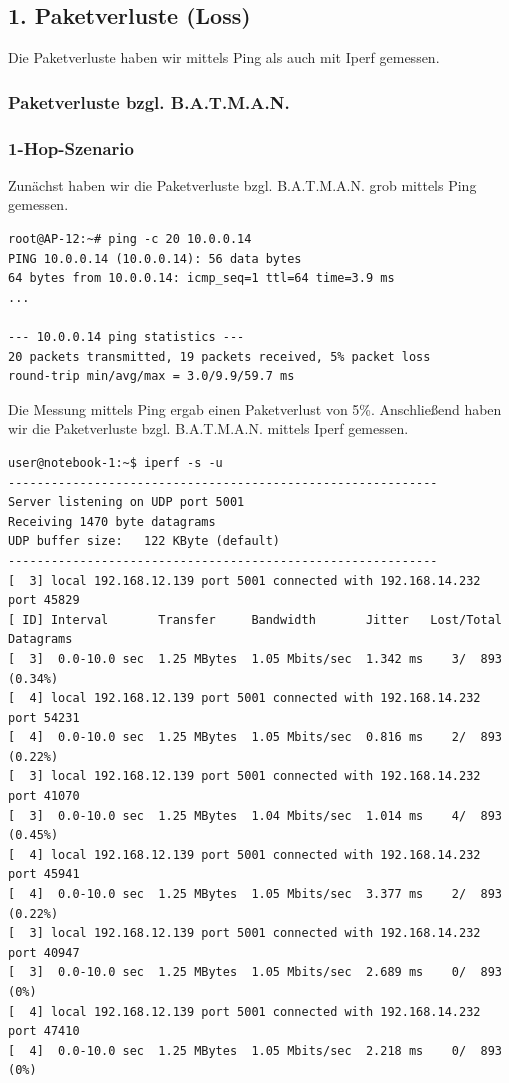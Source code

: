 \documentclass[a4paper,10pt]{article}
\begin{document}
\subsection{1. Paketverluste (Loss)}

Die Paketverluste haben wir mittels Ping als auch mit Iperf gemessen.

\subsubsection{Paketverluste bzgl. B.A.T.M.A.N.}

\subsubsection*{1-Hop-Szenario}

Zunächst haben wir die Paketverluste bzgl. B.A.T.M.A.N. grob mittels Ping gemessen.

\begin{lstlisting}
root@AP-12:~# ping -c 20 10.0.0.14
PING 10.0.0.14 (10.0.0.14): 56 data bytes
64 bytes from 10.0.0.14: icmp_seq=1 ttl=64 time=3.9 ms
...

--- 10.0.0.14 ping statistics ---
20 packets transmitted, 19 packets received, 5% packet loss
round-trip min/avg/max = 3.0/9.9/59.7 ms
\end{lstlisting}

Die Messung mittels Ping ergab einen Paketverlust von 5\%.
Anschließend haben wir die Paketverluste bzgl. B.A.T.M.A.N. mittels Iperf gemessen.

\begin{lstlisting}
user@notebook-1:~$ iperf -s -u
------------------------------------------------------------
Server listening on UDP port 5001
Receiving 1470 byte datagrams
UDP buffer size:   122 KByte (default)
------------------------------------------------------------
[  3] local 192.168.12.139 port 5001 connected with 192.168.14.232 port 45829
[ ID] Interval       Transfer     Bandwidth       Jitter   Lost/Total Datagrams
[  3]  0.0-10.0 sec  1.25 MBytes  1.05 Mbits/sec  1.342 ms    3/  893 (0.34%)
[  4] local 192.168.12.139 port 5001 connected with 192.168.14.232 port 54231
[  4]  0.0-10.0 sec  1.25 MBytes  1.05 Mbits/sec  0.816 ms    2/  893 (0.22%)
[  3] local 192.168.12.139 port 5001 connected with 192.168.14.232 port 41070
[  3]  0.0-10.0 sec  1.25 MBytes  1.04 Mbits/sec  1.014 ms    4/  893 (0.45%)
[  4] local 192.168.12.139 port 5001 connected with 192.168.14.232 port 45941
[  4]  0.0-10.0 sec  1.25 MBytes  1.05 Mbits/sec  3.377 ms    2/  893 (0.22%)
[  3] local 192.168.12.139 port 5001 connected with 192.168.14.232 port 40947
[  3]  0.0-10.0 sec  1.25 MBytes  1.05 Mbits/sec  2.689 ms    0/  893 (0%)
[  4] local 192.168.12.139 port 5001 connected with 192.168.14.232 port 47410
[  4]  0.0-10.0 sec  1.25 MBytes  1.05 Mbits/sec  2.218 ms    0/  893 (0%)
\end{lstlisting}
\end{document}
